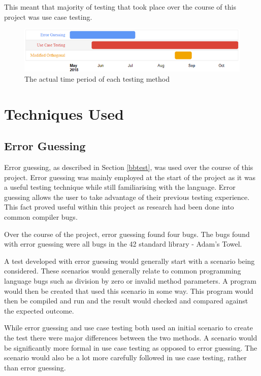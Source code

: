 This meant that majority of testing that took place over the course of this project was use case testing.

\begin{figure}[h]
\includegraphics{nis}
\caption{The actual time period of each testing method}
\end{figure}

\section{Techniques Used \label{testMethods}}

\subsection{Error Guessing}

Error guessing, as described in Section \ref{bbtest}, was used over the course of this project. Error guessing was mainly employed at the start of the project as it was a useful testing technique while still familiarising with the language. Error guessing allows the user to take advantage of their previous testing experience. This fact proved useful within this project as research had been done into common compiler bugs. 

Over the course of the project, error guessing found four bugs. The bugs found with error guessing were all bugs in the 42 standard library - Adam's Towel. 

A test developed with error guessing would generally start with a scenario being considered. These scenarios would generally relate to common programming language bugs such as division by zero or invalid method parameters. A program would then be created that used this scenario in some way. This program would then be compiled and run and the result would checked and compared against the expected outcome.

While error guessing and use case testing both used an initial scenario to create the test there were major differences between the two methods. A scenario would be significantly more formal in use case testing as opposed to error guessing. The scenario would also be a lot more carefully followed in use case testing, rather than error guessing.

